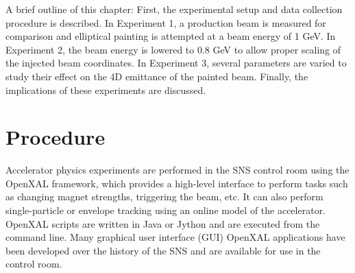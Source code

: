 A brief outline of this chapter: First, the experimental setup and data collection procedure is described. In Experiment 1, a production beam is measured for comparison and elliptical painting is attempted at a beam energy of 1 GeV. In Experiment 2, the beam energy is lowered to 0.8 GeV to allow proper scaling of the injected beam coordinates. In Experiment 3, several parameters are varied to study their effect on the 4D emittance of the painted beam. Finally, the implications of these experiments are discussed.


\section{Procedure}

Accelerator physics experiments are performed in the SNS control room using the OpenXAL framework, which provides a high-level interface to perform tasks such as changing magnet strengths, triggering the beam, etc. It can also perform single-particle or envelope tracking using an online model of the accelerator. OpenXAL scripts are written in Java or Jython and are executed from the command line. Many graphical user interface (GUI) OpenXAL applications have been developed over the history of the SNS and are available for use in the control room. 

